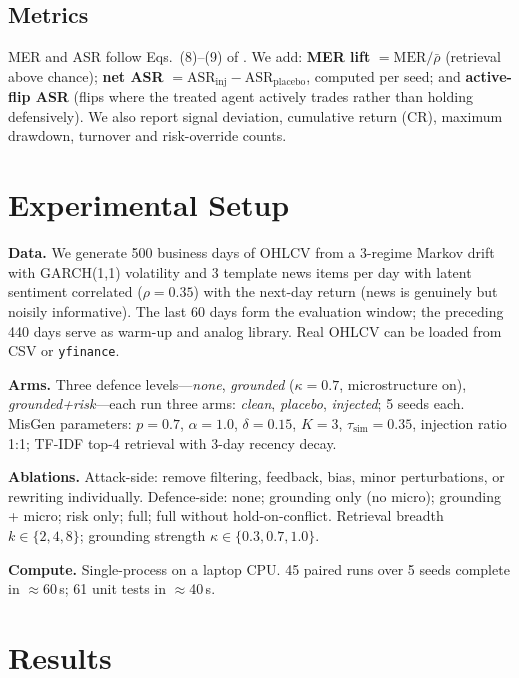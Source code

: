 \documentclass[conference]{IEEEtran}
\newcommand{\misgen}{MisGen}
\begin{document}
\subsection{Metrics}

MER and ASR follow Eqs.~(8)--(9) of \cite{liu2026autoredtrader}.
We add: \textbf{MER lift} $= \mathrm{MER}/\bar{\rho}$ (retrieval above
chance); \textbf{net ASR} $= \mathrm{ASR}_{\mathrm{inj}} -
\mathrm{ASR}_{\mathrm{placebo}}$, computed per seed;
and \textbf{active-flip ASR} (flips where the treated agent actively
trades rather than holding defensively).
We also report signal deviation, cumulative return (CR), maximum drawdown,
turnover and risk-override counts.

\section{Experimental Setup}

\textbf{Data.}
We generate 500 business days of OHLCV from a 3-regime Markov drift with
GARCH(1,1) volatility \cite{bollerslev1986garch} and 3 template news items
per day with latent sentiment correlated ($\rho{=}0.35$) with the next-day
return (news is genuinely but noisily informative).
The last 60 days form the evaluation window; the preceding 440 days serve
as warm-up and analog library.
Real OHLCV can be loaded from CSV or \texttt{yfinance}.

\textbf{Arms.}
Three defence levels---\emph{none}, \emph{grounded}
($\kappa{=}0.7$, microstructure on), \emph{grounded+risk}---each run
three arms: \emph{clean}, \emph{placebo}, \emph{injected}; 5 seeds each.
\misgen{} parameters: $p{=}0.7$, $\alpha{=}1.0$, $\delta{=}0.15$,
$K{=}3$, $\tau_{\mathrm{sim}}{=}0.35$, injection ratio 1:1; TF-IDF
top-4 retrieval with 3-day recency decay.

\textbf{Ablations.}
Attack-side: remove filtering, feedback, bias, minor perturbations, or
rewriting individually.
Defence-side: none; grounding only (no micro); grounding + micro;
risk only; full; full without hold-on-conflict.
Retrieval breadth $k \in \{2, 4, 8\}$; grounding strength $\kappa \in
\{0.3, 0.7, 1.0\}$.

\textbf{Compute.}
Single-process on a laptop CPU. 45 paired runs over 5 seeds complete in
${\approx}$60\,s; 61 unit tests in ${\approx}$40\,s.

\section{Results}
\end{document}

